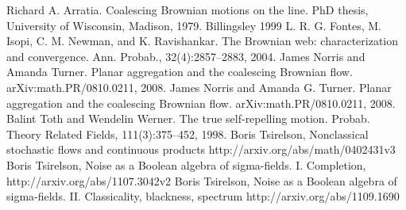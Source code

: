 \begin{thebibliography}{99}
 Richard A. Arratia. Coalescing Brownian motions on
  the line. PhD thesis, University of Wisconsin, Madison, 1979.
 Billingsley 1999
 L. R. G. Fontes, M. Isopi, C. M. Newman, and
  K. Ravishankar. The Brownian web: characterization and
  convergence. Ann. Probab., 32(4):2857--2883, 2004.
 James Norris and Amanda
  Turner. Planar aggregation and the coalescing Brownian flow.
  arXiv:math.PR/0810.0211, 2008.
 James Norris and Amanda
  G. Turner. Planar aggregation and the coalescing Brownian
  flow. arXiv:math.PR/0810.0211, 2008.
 Balint Toth and Wendelin Werner. The true
  self-repelling motion. Probab. Theory Related Fields,
  111(3):375--452, 1998.
 Boris Tsirelson,
  Nonclassical stochastic flows and continuous products
  http://arxiv.org/abs/math/0402431v3
 Boris Tsirelson, Noise as a Boolean
  algebra of sigma-fields. I. Completion, http://arxiv.org/abs/1107.3042v2
 Boris Tsirelson,
  Noise as a Boolean algebra of sigma-fields. II. Classicality,
  blackness, spectrum
  http://arxiv.org/abs/1109.1690
\end{thebibliography}
